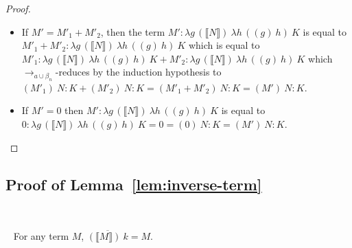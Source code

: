 \documentclass{LMCS}
\newcommand{\recap}[2]{\medskip\noindent{\bf #1 \ref{#2}.}~}
\newcommand{\xto}[1]{\ensuremath{\rightarrow_{#1}}}
\newcommand{\tobalgred}{\xto{a\cup\beta_n}}
\newcommand{\wt}[1]{\llbracket{#1}\rrbracket}
\begin{document}
\begin{proof}
\begin{description}
\begin{itemize}
\begin{itemize}
\begin{itemize}
		\item If $M' = M'_1+M'_2$, then the term $M':\lambda g\,(\wt{N})~\lambda h\,((g)~h)~K$ is equal to $M'_1+M'_2 :\lambda g\,(\wt{N})~\lambda h\,((g)~h)~K$ which is equal to $M'_1 :\lambda g\,(\wt{N})~\lambda h\,((g)~h)~K+M'_2 :\lambda g\,(\wt{N})~\lambda h\,((g)~h)~K$ which $\tobalgred$-reduces by the induction hypothesis to $(M'_1)~N:K+(M'_2)~N : K = (M'_1+M'_2)~N:K = (M')~N : K$.
		\item If $M'=0$ then $M':\lambda g\,(\wt{N})~\lambda h\,((g)~h)~K$ is equal to $0 :\lambda g\,(\wt{N})~\lambda h\,((g)~h)~K = 0= (0)~N:K = (M')~N : K$.\qedhere
	      \end{itemize}
	  \end{itemize}
      \end{itemize}
  \end{description} 
\end{proof}

\subsection{Proof of Lemma~\ref{lem:inverse-term}}\label{proof:inverse-term}~

\recap{Lemma}{lem:inverse-term} For any term $M$, $\overline{(\wt M)~k}=M$.
\end{document}

